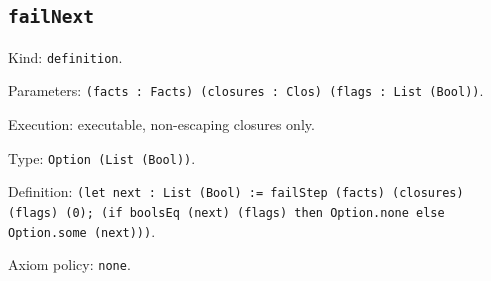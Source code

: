 \documentclass[11pt]{article}
\begin{document}
\subsection*{\texttt{failNext}}
\noindent Kind: \texttt{definition}.\par
\noindent Parameters: \texttt{(facts : Facts) (closures : Clos) (flags : List (Bool))}.\par
\noindent Execution: executable, non-escaping closures only.\par
\noindent Type: \texttt{Option (List (Bool))}.\par
\noindent Definition: \texttt{(let next : List (Bool) := failStep (facts) (closures) (flags) (0); (if boolsEq (next) (flags) then Option.none else Option.some (next)))}.\par
\noindent Axiom policy: \texttt{none}.\par
\end{document}
